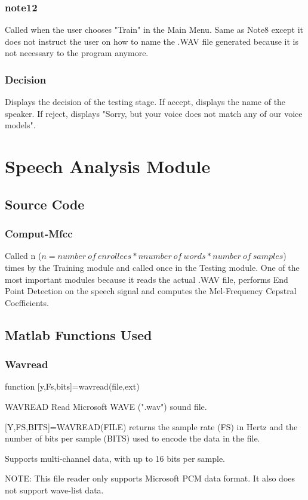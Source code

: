 \subsubsection{note12}
Called when the user chooses "Train" in the Main Menu. Same as
Note8 except it does not instruct the user on how to name the .WAV
file generated because it is not necessary to the program anymore.

\subsubsection{Decision}
Displays the decision of the testing stage. If accept, displays
the name of the speaker. If reject, displays "Sorry, but your
voice does not match any of our voice models".


\section{Speech Analysis Module}
\subsection{Source Code}
\subsubsection{Comput-Mfcc}
Called n ($n = number~of~enrollees * nnumber~of~words *
number~of~samples$) times by the Training module and called once
in the Testing module. One of the most important modules because
it reads the actual .WAV file, performs End Point Detection on the
speech signal and computes the Mel-Frequency Cepstral
Coefficients.

\subsection{Matlab Functions Used}
\subsubsection{Wavread}
function [y,Fs,bits]=wavread(file,ext)

WAVREAD Read Microsoft WAVE (".wav") sound file.

   [Y,FS,BITS]=WAVREAD(FILE) returns the sample rate (FS) in Hertz
   and the number of bits per sample (BITS) used to encode the
   data in the file.

   Supports multi-channel data, with up to 16 bits per sample.

 NOTE: This file reader only supports Microsoft PCM data format.
       It also does not support wave-list data.

